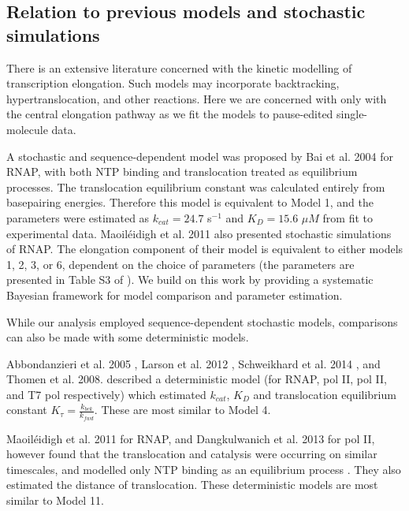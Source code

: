 \documentclass[10pt,letterpaper]{article}
\begin{document}
\subsection*{Relation to previous models and stochastic simulations}


There is an extensive literature concerned with the kinetic modelling of transcription elongation. Such models may incorporate backtracking, hypertranslocation, and other reactions. Here we are concerned with only with the central elongation pathway as we fit the models to pause-edited single-molecule data. 


A stochastic and sequence-dependent model  was proposed by Bai et al. 2004 \cite{bai2004sequence} for RNAP, with both NTP binding and translocation treated as equilibrium processes. The translocation equilibrium constant was calculated entirely from basepairing energies. Therefore this model is equivalent to Model 1, and the parameters were estimated as $k_{cat} = 24.7$ s$^{-1}$ and $K_D = 15.6$ $\mu M$ from fit to experimental data. Maoil{\'e}idigh et al. 2011 also presented stochastic simulations of RNAP. The elongation component of their model is equivalent to either models 1, 2, 3, or 6, dependent on the choice of parameters (the parameters are presented in Table S3 of \cite{maoileidigh2011unified}). We build on this work by providing a systematic Bayesian framework for model comparison and parameter estimation.   \par

While our analysis employed sequence-dependent stochastic models, comparisons can also be made with some deterministic models. 


Abbondanzieri et al. 2005 \cite{abbondanzieri2005direct}, Larson et al. 2012 \cite{larson2012trigger} , Schweikhard et al. 2014 \cite{schweikhard2014transcription}, and Thomen et al. 2008. \cite{thomen2008t7, thomen2005unravelling}  described a deterministic model (for RNAP, pol II, pol II, and T7 pol respectively) which estimated $k_{cat}$, $K_D$ and translocation equilibrium constant $K_\tau = \frac{k_{bck}}{k_{fwd}}$. These are most similar to Model 4.




Maoil{\'e}idigh et al. 2011 for RNAP, and Dangkulwanich et al. 2013 for pol II, however found that the translocation and catalysis were occurring on similar timescales, and modelled only NTP binding as an equilibrium process  \cite{maoileidigh2011unified, Dangkulwanich2013complete}. They also estimated the distance of translocation. These deterministic models are most similar to Model 11. 
\end{document}
